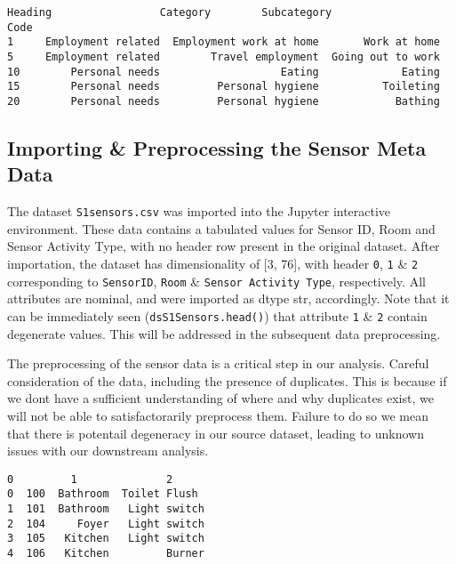 \documentclass[reprint, floatfix, groupaddress, prb]{revtex4-1}
\newcommand{\prompt}[4]{
        \llap{{\color{#2}[#3]: #4}}\vspace{-1.25em}
    }
\begin{document}
            \begin{tcolorbox}[breakable, boxrule=.5pt, size=fbox, pad at break*=1mm, opacityfill=0]
\prompt{Out}{outcolor}{22}{\hspace{3.5pt}}
\begin{Verbatim}[commandchars=\\\{\}]
                 Heading                 Category        Subcategory
Code
1     Employment related  Employment work at home       Work at home
5     Employment related        Travel employment  Going out to work
10        Personal needs                   Eating             Eating
15        Personal needs         Personal hygiene          Toileting
20        Personal needs         Personal hygiene            Bathing
\end{Verbatim}
\end{tcolorbox}
        
    \hypertarget{importing-preprocessing-the-sensor-meta-data}{%
\subsection{Importing \& Preprocessing the Sensor Meta
Data}\label{importing-preprocessing-the-sensor-meta-data}}

    The dataset \texttt{S1sensors.csv} was imported into the Jupyter
interactive environment. These data contains a tabulated values for
Sensor ID, Room and Sensor Activity Type, with no header row present in
the original dataset. After importation, the dataset has dimensionality
of {[}3, 76{]}, with header \texttt{0}, \texttt{1} \& \texttt{2}
corresponding to \texttt{SensorID}, \texttt{Room} \&
\texttt{Sensor\ Activity\ Type}, respectively. All attributes are
nominal, and were imported as dtype str, accordingly. Note that it can
be immediately seen (\texttt{dsS1Sensors.head()}) that attribute
\texttt{1} \& \texttt{2} contain degenerate values. This will be
addressed in the subsequent data preprocessing.

The preprocessing of the sensor data is a critical step in our analysis.
Careful consideration of the data, including the presence of duplicates.
This is because if we dont have a sufficient understanding of where and
why duplicates exist, we will not be able to satisfactorarily preprocess
them. Failure to do so we mean that there is potentail degeneracy in our
source dataset, leading to unknown issues with our downstream analysis.


            \begin{tcolorbox}[breakable, boxrule=.5pt, size=fbox, pad at break*=1mm, opacityfill=0]
\prompt{Out}{outcolor}{23}{\hspace{3.5pt}}
\begin{Verbatim}[commandchars=\\\{\}]
     0         1              2
0  100  Bathroom  Toilet Flush
1  101  Bathroom   Light switch
2  104     Foyer   Light switch
3  105   Kitchen   Light switch
4  106   Kitchen         Burner
\end{Verbatim}
\end{tcolorbox}
        
\end{document}

